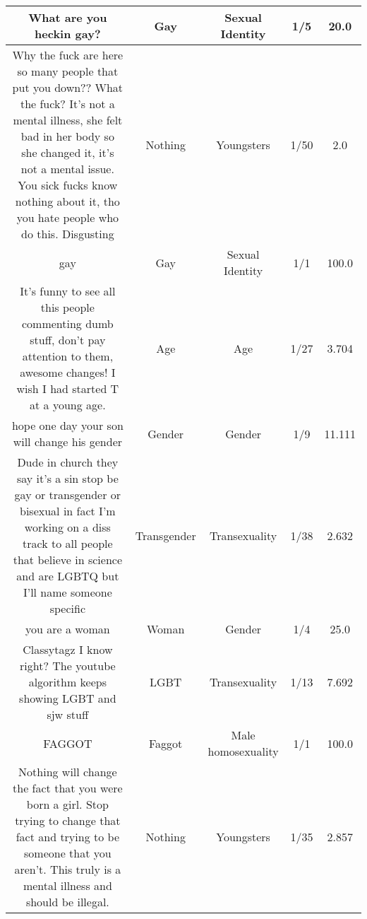 \documentclass[11pt]{article}
\newlength\mylength
\begin{document}
\begin{center}
\begin{longtable}{|C{.40\mylength}|C{.30\mylength}|C{.15\mylength}|C{.15\mylength}|C{.15\mylength}|}
  What are you heckin gay?  & Gay & Sexual Identity & 1/5 & 20.0 \\  \hline
  Why the fuck are here so many people that put you down?? What the fuck? It's not a mental illness, she felt bad in her body so she changed it, it's not a mental issue. You sick fucks know nothing about it, tho you hate people who do this. Disgusting  & Nothing & Youngsters & 1/50 & 2.0 \\  \hline
  gay  & Gay & Sexual Identity & 1/1 & 100.0 \\  \hline
  It's funny to see all this people commenting dumb stuff, don't pay attention to them, awesome changes! I wish I had started T at a young age.  & Age & Age & 1/27 & 3.704 \\  \hline
  hope one day your son will change his gender  & Gender & Gender & 1/9 & 11.111 \\  \hline
  Dude in church they say it's a sin stop be gay or transgender or bisexual in fact I'm working on a diss track to all people that believe in science and are LGBTQ but I'll name someone specific  & Transgender & Transexuality & 1/38 & 2.632 \\  \hline
  you are a woman  & Woman & Gender & 1/4 & 25.0 \\  \hline
  Classytagz I know right? The youtube algorithm keeps showing LGBT and sjw stuff  & LGBT & Transexuality & 1/13 & 7.692 \\  \hline
  FAGGOT  & Faggot & Male homosexuality & 1/1 & 100.0 \\  \hline
  Nothing will change the fact that you were born a girl. Stop trying to change that fact and trying to be someone that you aren't. This truly is a mental illness and should be illegal.  & Nothing & Youngsters & 1/35 & 2.857 \\  \hline

\end{longtable}
\end{center}
\end{document}
